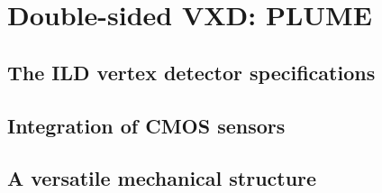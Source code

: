 \chapter{Double-sided VXD: PLUME}

  \section{The ILD vertex detector specifications}

  \section{Integration of CMOS sensors}

  \section{A versatile mechanical structure}
